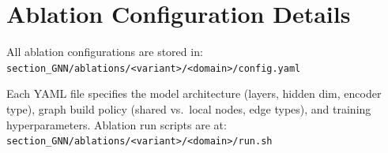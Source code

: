 \documentclass[12pt,a4paper]{report}
\begin{document}
\chapter{Ablation Configuration Details}
\label{app:ablation_configs}

All ablation configurations are stored in:\\
\texttt{section\_GNN/ablations/<variant>/<domain>/config.yaml}

Each YAML file specifies the model architecture (layers, hidden dim, encoder type), graph build policy (shared vs.\ local nodes, edge types), and training hyperparameters. Ablation run scripts are at:\\
\texttt{section\_GNN/ablations/<variant>/<domain>/run.sh}

% 






\end{document}

